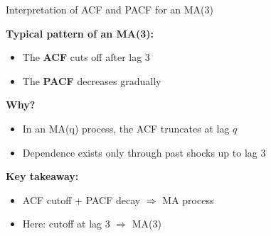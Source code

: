 \documentclass[aspectratio=169]{beamer}
\begin{document}
\begin{frame}{Interpretation of ACF and PACF for an MA(3)}

\textbf{Typical pattern of an MA(3):}
\begin{itemize}
    \item The \textbf{ACF} cuts off after lag 3
    \item The \textbf{PACF} decreases gradually
\end{itemize}

\vspace{0.4cm}

\textbf{Why?}
\begin{itemize}
    \item In an MA(q) process, the ACF truncates at lag $q$
    \item Dependence exists only through past shocks up to lag 3
\end{itemize}

\vspace{0.4cm}

\textbf{Key takeaway:}
\begin{itemize}
    \item ACF cutoff + PACF decay $\Rightarrow$ MA process
    \item Here: cutoff at lag 3 $\Rightarrow$ MA(3)
\end{itemize}

\end{frame}
\end{document}
